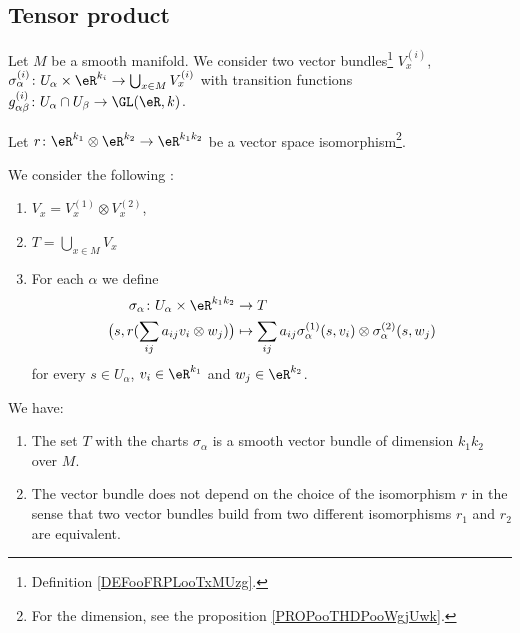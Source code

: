 \subsection{Tensor product}

\begin{propositionDef}		\label{DEFooCSDZooJuzGuE}
	Let \( M \) be a smooth manifold. We consider two vector bundles\footnote{Definition \ref{DEFooFRPLooTxMUzg}.} \( V_x^{(i)}\), \( \sigma_{\alpha}^{(i)}  \colon U_{\alpha}\times \eR^{k_i}\to \bigcup_{x\in M}V_x^{(i)} \) with transition functions \(g_{\alpha\beta}^{(i)} \colon U_{\alpha}\cap U_{\beta}\to \GL(\eR,k)  \).

	Let \(r \colon \eR^{k_1}\otimes \eR^{k_2}\to \eR^{k_1k_2}  \) be a vector space isomorphism\footnote{For the dimension, see the proposition \ref{PROPooTHDPooWgjUwk}.}.

	We consider the following :
	\begin{enumerate}
		\item
		      \( V_x=V_x^{(1)}\otimes V_x^{(2)}\),
		\item
		      \( T=\bigcup_{x\in M}V_x\)
		\item For each \( \alpha\) we define
		      \begin{equation}		\label{EQooXHURooBpOMlU}
			      \begin{aligned}
				      \sigma_{\alpha}\colon U_{\alpha}\times \eR^{k_1k_2} & \to T                                                                                   \\
				      \big( s, r(\sum_{ij}a_{ij} v_i\otimes w_j) \big)    & \mapsto \sum_{ij}a_{ij}\sigma_{\alpha}^{(1)}(s,v_i)\otimes \sigma_{\alpha}^{(2)}(s,w_j)
			      \end{aligned}
		      \end{equation}
		      for every \( s\in U_{\alpha}\), \( v_i\in \eR^{k_1}\) and \( w_j\in \eR^{k_2}\).
	\end{enumerate}

	We have:
	\begin{enumerate}
		\item
		      The set	\( T\) with the charts \( \sigma_{\alpha} \) is a smooth vector bundle of dimension \( k_1k_2\) over \( M\).
		\item
		      The vector bundle does not depend on the choice of the isomorphism \( r\) in the sense that two vector bundles build from two different isomorphisms \( r_1\) and \( r_2\) are equivalent.
	\end{enumerate}
\end{propositionDef}

